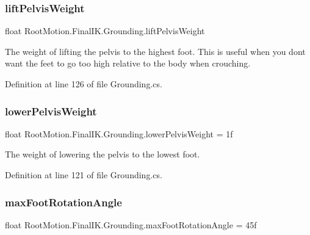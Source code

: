 \subsubsection{\texorpdfstring{lift\+Pelvis\+Weight}{liftPelvisWeight}}
{\footnotesize\ttfamily float Root\+Motion.\+Final\+I\+K.\+Grounding.\+lift\+Pelvis\+Weight}



The weight of lifting the pelvis to the highest foot. This is useful when you don\textquotesingle{}t want the feet to go too high relative to the body when crouching. 



Definition at line 126 of file Grounding.\+cs.

\mbox{\label{class_root_motion_1_1_final_i_k_1_1_grounding_aea1479e0ac46ce074118a1e06ff7de60}} 
\subsubsection{\texorpdfstring{lower\+Pelvis\+Weight}{lowerPelvisWeight}}
{\footnotesize\ttfamily float Root\+Motion.\+Final\+I\+K.\+Grounding.\+lower\+Pelvis\+Weight = 1f}



The weight of lowering the pelvis to the lowest foot. 



Definition at line 121 of file Grounding.\+cs.

\mbox{\label{class_root_motion_1_1_final_i_k_1_1_grounding_aeba0887741bad61eea60781791e5196d}} 
\subsubsection{\texorpdfstring{max\+Foot\+Rotation\+Angle}{maxFootRotationAngle}}
{\footnotesize\ttfamily float Root\+Motion.\+Final\+I\+K.\+Grounding.\+max\+Foot\+Rotation\+Angle = 45f}



